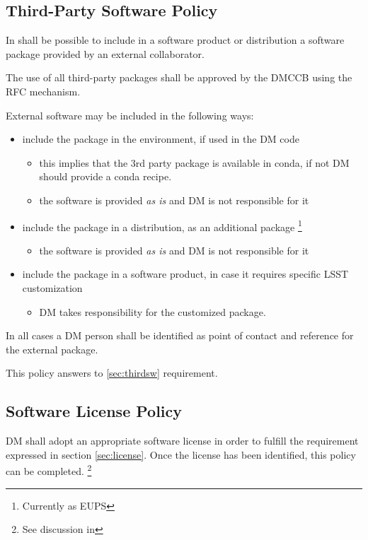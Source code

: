 \subsection{Third-Party Software Policy} \label{sec:thirdpolicy}

In shall be possible to include in a software product or distribution a software package provided by an external collaborator.

The use of all third-party packages shall be approved by the DMCCB using the RFC mechanism.

External software may be included in the following ways:

\begin{itemize}
\item include the package in the environment, if used in the DM code
    \begin{itemize}
    \item this implies that the 3rd party package is available in conda, if not DM should provide a conda recipe.
    \item the software is provided \textit{as is} and DM is not responsible for it
    \end{itemize}
\item include the package in a distribution, as an additional  package \footnote{Currently as EUPS}
    \begin{itemize}
    \item the software is provided \textit{as is} and DM is not responsible for it
    \end{itemize}
\item include the package in a software product, in case it requires specific LSST customization
    \begin{itemize}
    \item DM takes responsibility for the customized package.
    \end{itemize}
\end{itemize}

In all cases a DM person shall be identified as point of contact and reference for the external package.

This policy answers to \ref{sec:thirdsw} requirement.


\subsection{Software License Policy} \label{sec:licensepolicy}

DM shall adopt an appropriate software license in order to fulfill the requirement expressed in section \ref{sec:license}.
Once the license has been identified, this policy can be completed.
\footnote{See discussion in }


